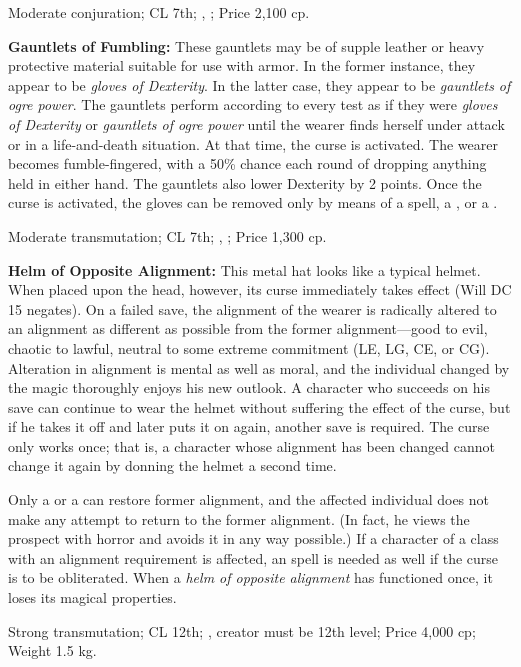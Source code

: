 Moderate conjuration; CL 7th; , ; Price 2,100 cp.

\textbf{Gauntlets of Fumbling:} These gauntlets may be of supple leather or heavy protective material suitable for use with armor. In the former instance, they appear to be \emph{gloves of Dexterity}. In the latter case, they appear to be \emph{gauntlets of ogre power}. The gauntlets perform according to every test as if they were \emph{gloves of Dexterity} or \emph{gauntlets of ogre power} until the wearer finds herself under attack or in a life-and-death situation. At that time, the curse is activated. The wearer becomes fumble-fingered, with a 50\% chance each round of dropping anything held in either hand. The gauntlets also lower Dexterity by 2 points. Once the curse is activated, the gloves can be removed only by means of a  spell, a , or a .

Moderate transmutation; CL 7th; , ; Price 1,300 cp.

\textbf{Helm of Opposite Alignment:} This metal hat looks like a typical helmet. When placed upon the head, however, its curse immediately takes effect (Will DC 15 negates). On a failed save, the alignment of the wearer is radically altered to an alignment as different as possible from the former alignment---good to evil, chaotic to lawful, neutral to some extreme commitment (LE, LG, CE, or CG). Alteration in alignment is mental as well as moral, and the individual changed by the magic thoroughly enjoys his new outlook. A character who succeeds on his save can continue to wear the helmet without suffering the effect of the curse, but if he takes it off and later puts it on again, another save is required. The curse only works once; that is, a character whose alignment has been changed cannot change it again by donning the helmet a second time.

Only a  or a  can restore former alignment, and the affected individual does not make any attempt to return to the former alignment. (In fact, he views the prospect with horror and avoids it in any way possible.) If a character of a class with an alignment requirement is affected, an  spell is needed as well if the curse is to be obliterated. When a \emph{helm of opposite alignment} has functioned once, it loses its magical properties.

Strong transmutation; CL 12th; , creator must be 12th level; Price 4,000 cp; Weight 1.5 kg.

